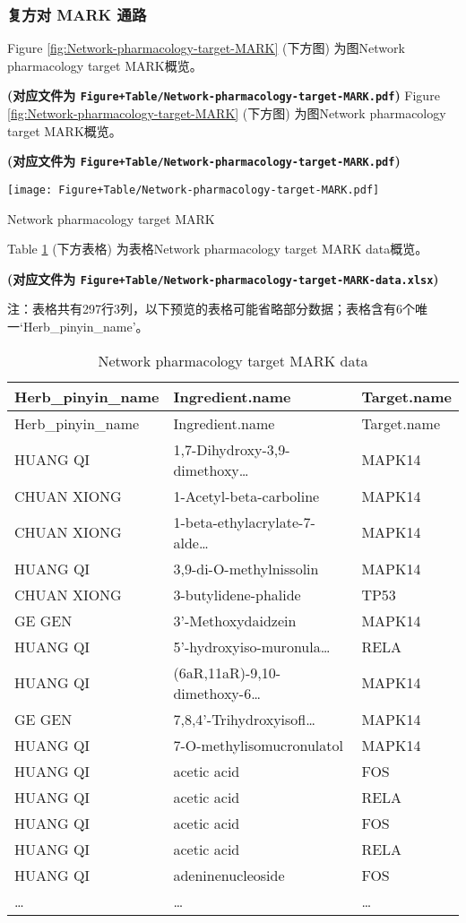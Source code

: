 \documentclass[
]{article}
\begin{document}
\hypertarget{ux590dux65b9ux5bf9-mark-ux901aux8def}{%
\subsubsection{复方对 MARK 通路}\label{ux590dux65b9ux5bf9-mark-ux901aux8def}}

Figure \ref{fig:Network-pharmacology-target-MARK} (下方图) 为图Network pharmacology target MARK概览。

\textbf{(对应文件为 \texttt{Figure+Table/Network-pharmacology-target-MARK.pdf})}
Figure \ref{fig:Network-pharmacology-target-MARK} (下方图) 为图Network pharmacology target MARK概览。

\textbf{(对应文件为 \texttt{Figure+Table/Network-pharmacology-target-MARK.pdf})}

\def\@captype{figure}
\begin{center}
\texttt{[image: Figure+Table/Network-pharmacology-target-MARK.pdf]}
\caption{Network pharmacology target MARK}\label{fig:Network-pharmacology-target-MARK}
\end{center}

Table \ref{tab:Network-pharmacology-target-MARK-data} (下方表格) 为表格Network pharmacology target MARK data概览。

\textbf{(对应文件为 \texttt{Figure+Table/Network-pharmacology-target-MARK-data.xlsx})}

\begin{center}\begin{tcolorbox}[colback=gray!10, colframe=gray!50, width=0.9\linewidth, arc=1mm, boxrule=0.5pt]注：表格共有297行3列，以下预览的表格可能省略部分数据；表格含有6个唯一`Herb\_pinyin\_name'。
\end{tcolorbox}
\end{center}

\begin{longtable}[]{@{}lll@{}}
\caption{\label{tab:Network-pharmacology-target-MARK-data}Network pharmacology target MARK data}\tabularnewline
\toprule
Herb\_pinyin\_name & Ingredient.name & Target.name\tabularnewline
\midrule
\endfirsthead
\toprule
Herb\_pinyin\_name & Ingredient.name & Target.name\tabularnewline
\midrule
\endhead
HUANG QI & 1,7-Dihydroxy-3,9-dimethoxy\ldots{} & MAPK14\tabularnewline
CHUAN XIONG & 1-Acetyl-beta-carboline & MAPK14\tabularnewline
CHUAN XIONG & 1-beta-ethylacrylate-7-alde\ldots{} & MAPK14\tabularnewline
HUANG QI & 3,9-di-O-methylnissolin & MAPK14\tabularnewline
CHUAN XIONG & 3-butylidene-phalide & TP53\tabularnewline
GE GEN & 3'-Methoxydaidzein & MAPK14\tabularnewline
HUANG QI & 5'-hydroxyiso-muronula\ldots{} & RELA\tabularnewline
HUANG QI & (6aR,11aR)-9,10-dimethoxy-6\ldots{} & MAPK14\tabularnewline
GE GEN & 7,8,4'-Trihydroxyisofl\ldots{} & MAPK14\tabularnewline
HUANG QI & 7-O-methylisomucronulatol & MAPK14\tabularnewline
HUANG QI & acetic acid & FOS\tabularnewline
HUANG QI & acetic acid & RELA\tabularnewline
HUANG QI & acetic acid & FOS\tabularnewline
HUANG QI & acetic acid & RELA\tabularnewline
HUANG QI & adeninenucleoside & FOS\tabularnewline
\ldots{} & \ldots{} & \ldots{}\tabularnewline
\bottomrule
\end{longtable}
\end{document}
